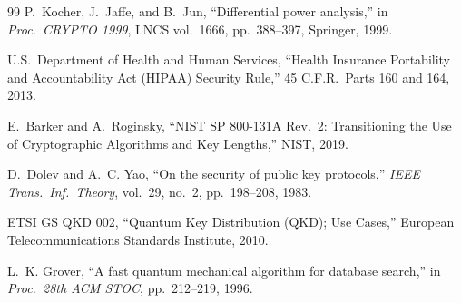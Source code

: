 \documentclass[10pt,journal,compsoc]{IEEEtran}
\begin{document}
\begin{thebibliography}{99}
P.~Kocher, J.~Jaffe, and B.~Jun, ``Differential power analysis,''
in \emph{Proc.\ CRYPTO 1999}, LNCS vol.\ 1666, pp.\ 388--397,
Springer, 1999.

U.S.\ Department of Health and Human Services,
``Health Insurance Portability and Accountability Act (HIPAA)
Security Rule,'' 45 C.F.R.\ Parts 160 and 164, 2013.

E.~Barker and A.~Roginsky,
``NIST SP 800-131A Rev.\ 2: Transitioning the Use of Cryptographic
Algorithms and Key Lengths,'' NIST, 2019.

D.~Dolev and A.~C. Yao, ``On the security of public key protocols,''
\emph{IEEE Trans.\ Inf.\ Theory}, vol.\ 29, no.\ 2,
pp.\ 198--208, 1983.

ETSI GS QKD 002, ``Quantum Key Distribution (QKD); Use Cases,''
European Telecommunications Standards Institute, 2010.

L.~K. Grover, ``A fast quantum mechanical algorithm for database
search,'' in \emph{Proc.\ 28th ACM STOC}, pp.\ 212--219, 1996.

\end{thebibliography}
\end{document}
